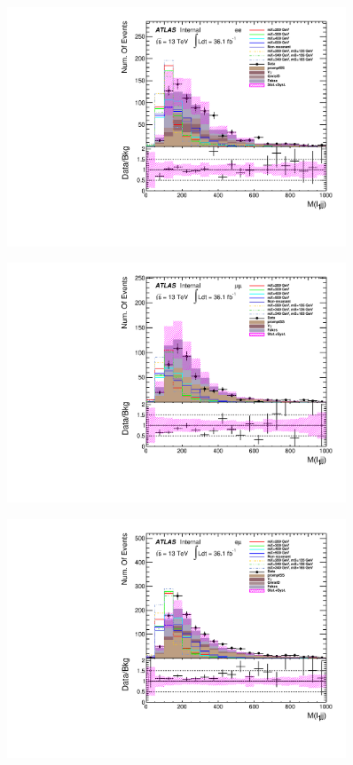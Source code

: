\begin{figure}[h]
\begin{minipage}[t]{0.33\linewidth}
 \label{fig:dataMC_low_Njet_CR:m_ll_emu.pdf}
 \end{minipage}
\begin{minipage}[t]{0.33\linewidth}
 \centering
 \includegraphics[width=0.9\textwidth,angle=-90]{fig/dataMC_low_Njet_CR/m_l1jj_ee.pdf}\label{fig:dataMC_low_Njet_CR:m_l1jj_ee.pdf}
 \end{minipage}
 \begin{minipage}[t]{0.33\linewidth}
 \centering
 \includegraphics[width=0.9\textwidth,angle=-90]{fig/dataMC_low_Njet_CR/m_l1jj_mumu.pdf}\label{fig:dataMC_low_Njet_CR:m_l1jj_mumu.pdf}
 \end{minipage}
 \begin{minipage}[t]{0.33\linewidth}
 \centering
 \includegraphics[width=0.9\textwidth,angle=-90]{fig/dataMC_low_Njet_CR/m_l1jj_emu.pdf}\label{fig:dataMC_low_Njet_CR:m_l1jj_emu.pdf}

\end{minipage}
\end{figure}
